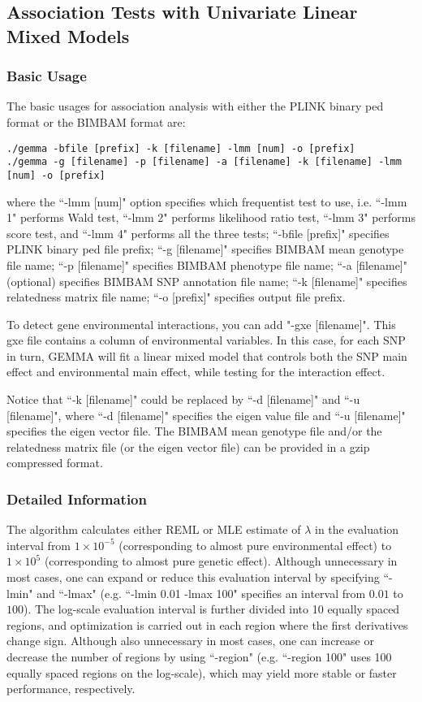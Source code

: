 \documentclass[11pt]{article}
\begin{document}
\subsection{Association Tests with Univariate Linear Mixed Models}
\subsubsection{Basic Usage}
The basic usages for association analysis with either the PLINK binary ped format or the BIMBAM format are:
\begin{verbatim}
./gemma -bfile [prefix] -k [filename] -lmm [num] -o [prefix]
./gemma -g [filename] -p [filename] -a [filename] -k [filename] -lmm [num] -o [prefix]
\end{verbatim}
where the ``-lmm [num]" option specifies which frequentist test to use, i.e. ``-lmm 1" performs Wald test, ``-lmm 2" performs likelihood ratio test, ``-lmm 3" performs score test, and ``-lmm 4" performs all the three tests; ``-bfile [prefix]" specifies PLINK binary ped file prefix; ``-g [filename]" specifies BIMBAM mean genotype file name; ``-p [filename]" specifies BIMBAM phenotype file name; ``-a [filename]" (optional) specifies BIMBAM SNP annotation file name; ``-k [filename]" specifies relatedness matrix file name; ``-o [prefix]" specifies output file prefix. 

To detect gene environmental interactions, you can add "-gxe [filename]". This gxe file contains a column of environmental variables. In this case, for each SNP in turn, GEMMA will fit a linear mixed model that controls both the SNP main effect and environmental main effect, while testing for the interaction effect. 

Notice that ``-k [filename]" could be replaced by ``-d [filename]" and ``-u [filename]", where ``-d [filename]" specifies the eigen value file and ``-u [filename]" specifies the eigen vector file. The BIMBAM mean genotype file and/or the relatedness matrix file (or the eigen vector file) can be provided in a gzip compressed format.

\subsubsection{Detailed Information}
The algorithm calculates either REML or MLE estimate of $\lambda$ in the evaluation interval from $1\times 10^{-5}$ (corresponding to almost pure environmental effect) to $1\times 10^5$ (corresponding to almost pure genetic effect). Although unnecessary in most cases, one can expand or reduce this evaluation interval by specifying ``-lmin" and ``-lmax" (e.g. ``-lmin 0.01 -lmax 100" specifies an interval from $0.01$ to $100$). The log-scale evaluation interval is further divided into 10 equally spaced regions, and optimization is carried out in each region where the first derivatives change sign. Although also unnecessary in most cases, one can increase or decrease the number of regions by using ``-region" (e.g. ``-region 100" uses 100 equally spaced regions on the log-scale), which may yield more stable or faster performance, respectively.
\end{document}
